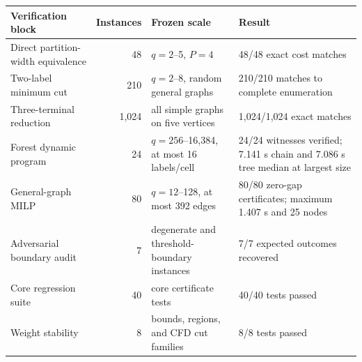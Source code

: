 \begin{tabularx}{\textwidth}{@{}p{}r p{}X@{}}
\toprule
Verification block & Instances & Frozen scale & Result \\
\midrule
Direct partition-width equivalence & 48 & $q=2$--5, $P=4$ & 48/48 exact cost matches \\
Two-label minimum cut & 210 & $q=2$--8, random general graphs & 210/210 matches to complete enumeration \\
Three-terminal reduction & 1,024 & all simple graphs on five vertices & 1,024/1,024 exact matches \\
Forest dynamic program & 24 & $q=256$--16,384, at most 16 labels/cell & 24/24 witnesses verified; 7.141 s chain and 7.086 s tree median at largest size \\
General-graph MILP & 80 & $q=12$--128, at most 392 edges & 80/80 zero-gap certificates; maximum 1.407 s and 25 nodes \\
Adversarial boundary audit & 7 & degenerate and threshold-boundary instances & 7/7 expected outcomes recovered \\
Core regression suite & 40 & core certificate tests & 40/40 tests passed \\
Weight stability & 8 & bounds, regions, and CFD cut families & 8/8 tests passed \\
\bottomrule
\end{tabularx}
